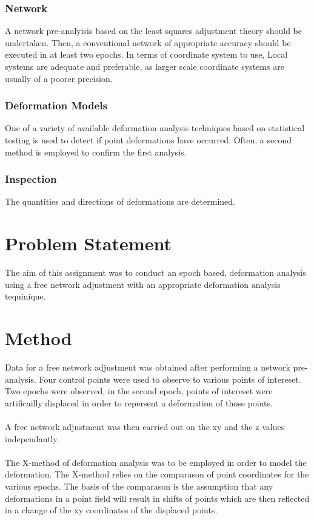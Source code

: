 \documentclass{article}
\begin{document}
\subsubsection{Network}
A network pre-analyisis based on the least squares adjustment theory should be
undertaken. Then, a conventional network of appropriate accuracy should be
executed in at least two epochs. In terms of coordinate system to use, Local
systems are adequate and preferable, as larger scale coordinate systems are
usually of a poorer precision.

\subsubsection{Deformation Models}
One of a variety of available deformation analysis techniques based on statistical
testing is used to detect if point deformations have occurred. Often, a second
method is employed to confirm the first analysis.

\subsubsection{Inspection}
The quantities and directions of deformations are determined.

\section{Problem Statement}
The aim of this assignment was to conduct an epoch based, deformation analysis
using a free network adjustment with an appropriate deformation analysis 
tequinique.

\section{Method}
Data for a free network adjustment was obtained after performing a network
pre-analysis. Four control points were used to observe to various points 
of intereset. Two epochs were observed, in the second epoch, points of intereset
were artificailly displaced in order to repersent a deformation of those points.

\paragraph{}
A free network adjustment was then carried out on the xy and the z values
independantly.

\paragraph{}
The X-method of deformation analysis was to be employed in order to model the 
deformation. The X-method relies on the comparason of point coordinates for the 
various epochs. The basis of the comparason is the assumption that any deformations
in a point field will result in shifts of points which are then reflected in a 
change of the xy coordinates of the displaced points.
\end{document}

